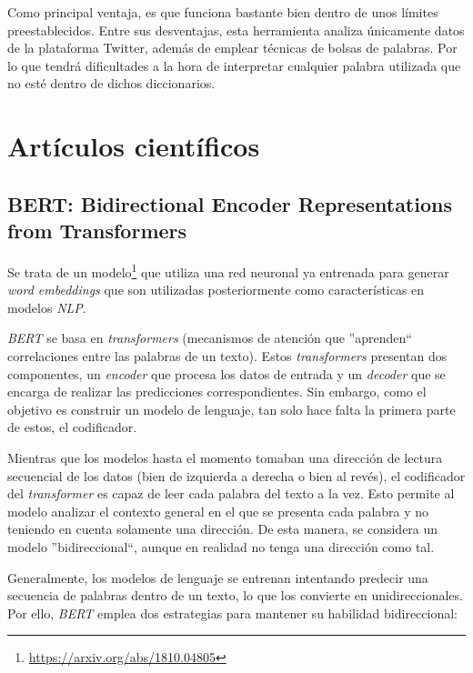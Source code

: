 Como principal ventaja, es que funciona bastante bien dentro de unos límites preestablecidos. Entre sus desventajas, esta herramienta analiza únicamente datos de la plataforma Twitter, además de emplear técnicas de bolsas de palabras. Por lo que tendrá dificultades a la hora de interpretar cualquier palabra utilizada que no esté dentro de dichos diccionarios.

\section{Artículos científicos}

\subsection{BERT: Bidirectional Encoder Representations from Transformers}

Se trata de un modelo\footnote{\url{https://arxiv.org/abs/1810.04805}} que utiliza una red neuronal ya entrenada para generar \textit{word embeddings} que son utilizadas posteriormente como características en modelos \textit{NLP}.

\textit{BERT} se basa en \textit{transformers} (mecanismos de atención que ''aprenden`` correlaciones entre las palabras de un texto). Estos \textit{transformers} presentan dos componentes, un \textit{encoder} que procesa los datos de entrada y un \textit{decoder} que se encarga de realizar las predicciones correspondientes. Sin embargo, como el objetivo es construir un modelo de lenguaje, tan solo hace falta la primera parte de estos, el codificador.

Mientras que los modelos hasta el momento tomaban una dirección de lectura secuencial de los datos (bien de izquierda a derecha o bien al revés), el codificador del \textit{transformer} es capaz de leer cada palabra del texto a la vez. Esto permite al modelo analizar el contexto general en el que se presenta cada palabra y no teniendo en cuenta solamente una dirección. De esta manera, se considera un modelo ''bidireccional``, aunque en realidad no tenga una dirección como tal.

Generalmente, los modelos de lenguaje se entrenan intentando predecir una secuencia de palabras dentro de un texto, lo que los convierte en unidireccionales. Por ello, \textit{BERT} emplea dos estrategias para mantener su habilidad bidireccional:

